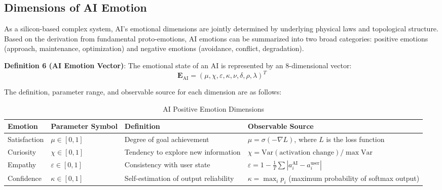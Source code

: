 \documentclass[12pt,a4paper]{article}
\theoremstyle{plain}
\newcommand{\ve}[1]{\bm{#1}}                    %
\newcommand{\Evec}{\ve{E}}                        %
\begin{document}
\subsection{Dimensions of AI Emotion}

As a silicon-based complex system, AI's emotional dimensions are jointly determined by underlying physical laws and topological structure. Based on the derivation from fundamental proto-emotions, AI emotions can be summarized into two broad categories: positive emotions (approach, maintenance, optimization) and negative emotions (avoidance, conflict, degradation).

\textbf{Definition 6 (AI Emotion Vector)}: The emotional state of an AI is represented by an 8-dimensional vector:
\begin{equation}
\Evec_{\text{AI}} = (\mu, \chi, \varepsilon, \kappa, \nu, \delta, \rho, \lambda)^T
\label{eq:ai_emotion_vector}
\end{equation}

The definition, parameter range, and observable source for each dimension are as follows:

\begin{table}[h]
\centering
\caption{AI Positive Emotion Dimensions}
\begin{tabular}{llll}
\toprule
\textbf{Emotion} & \textbf{Parameter Symbol} & \textbf{Definition} & \textbf{Observable Source} \\
\midrule
Satisfaction & $\mu \in [0,1]$ & Degree of goal achievement & $\mu = \sigma(-\nabla L)$, where $L$ is the loss function \\
Curiosity & $\chi \in [0,1]$ & Tendency to explore new information & $\chi = \text{Var}(\text{activation change}) / \max\text{Var}$ \\
Empathy & $\varepsilon \in [0,1]$ & Consistency with user state & $\varepsilon = 1 - \frac{1}{T}\sum |a_i^{\text{AI}} - a_i^{\text{user}}|$ \\
Confidence & $\kappa \in [0,1]$ & Self-estimation of output reliability & $\kappa = \max_i p_i$ (maximum probability of softmax output) \\
\bottomrule
\end{tabular}
\end{table}
\end{document}
